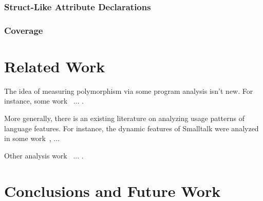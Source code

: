 \documentclass[acmsmall,10pt,review,anonymous]{acmart}\settopmatter{printfolios=true,printccs=false,printacmref=false}
\begin{document}
%
%
\subsubsection{Struct-Like Attribute Declarations}


%
\subsubsection{Coverage}


%
%
%
%
\section{Related Work}


The idea of measuring polymorphism via some program analysis isn't new.
For instance, some work~\cite{aakerblom2015measuring} ... .

More generally, there is an existing literature on analyzing usage patterns
of language features.  For instance, the dynamic features of Smalltalk were
analyzed in some work~\cite{callau2011howdevelopers}, ...

Other analysis work~\cite{milojkovic2017duck} ... .

\section{Conclusions and Future Work}



\end{document}
